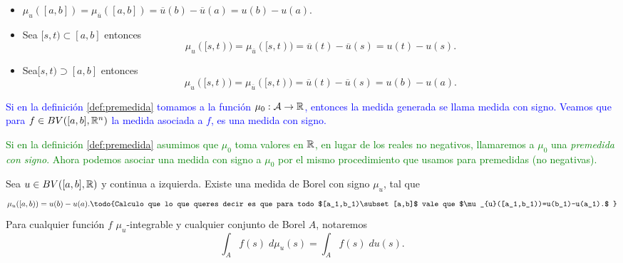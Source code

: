 \begin{obs}  \vphantom{a} \reversemarginpar \normalmarginpar {}
 
	\begin{itemize}
        \item $\mu_{u}([a,b])=\mu_{\overline{u}}([a,b])=\overline{u}(b)-\overline{u}(a)=u(b)-u(a)$.
		\item Sea $[s,t)\subset[a,b]$ entonces $$\mu_{u}([s,t))=\mu_{\overline{u}}([s,t))=\overline{u}(t)-\overline{u}(s)=u(t)-u(s).$$
		
		\item Sea$[s,t)\supset[a,b]$ entonces
		$$\mu_{u}([s,t))=\mu_{\overline{u}}([s,t))=\overline{u}(t)-\overline{u}(s)=u(b)-u(a).$$
	\end{itemize}
\end{obs}






 
\textcolor{blue}{Si en la definición \ref{def:premedida} tomamos a la función $\mu_0:\mathcal{A}\to \mathbb{R}$, entonces la medida generada se llama medida con signo. Veamos que para $f\in BV([a,b],\mathbb{R}^n)$ la medida asociada a $f$, es una medida con signo.}
\normalmarginpar
{}


\reversemarginpar
\textcolor{green}{
 Si en la definición \ref{def:premedida} asumimos que $\mu_0$ toma valores en $\mathbb{R}$, en lugar de los reales no negativos, llamaremos  a $\mu_0$ una \emph{premedida con signo}. Ahora podemos asociar una medida con signo a $\mu_0$ por el mismo procedimiento que usamos para premedidas (no negativas). }
 


\begin{thm} \label{Thm:medidas}
    	Sea $u\in BV([a,b],\mathbb{R})$ y continua a izquierda. Existe una medida de Borel con signo $\mu_{u}$, tal que $$\mu_{u}([a,b))=u(b)-u(a).\textrm{\todo{Calculo que lo que queres decir es que para todo $[a_1,b_1)\subset [a,b]$ vale que $\mu_{u}([a_1,b_1))=u(b_1)-u(a_1).$ }}$$  Para cualquier función $f$ $\mu_{u}$-integrable  y cualquier conjunto de Borel $A$, notaremos
	$$\int_{A}f(s)\;d\mu_{u}(s)=\int_{A}f(s)\;du(s).$$  
\end{thm}





